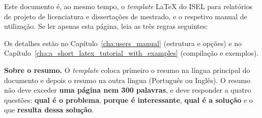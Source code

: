 Este documento é, ao mesmo tempo, o \emph{template} \LaTeX{} do ISEL para relatórios de projeto de licenciatura e dissertações de mestrado, e o respetivo manual de utilização. Se ler apenas esta página, leia as três regras seguintes:

\bigskip
\noindent%

\bigskip
Os detalhes estão no Capítulo~\ref{cha:users_manual} (estrutura e opções) e no Capítulo~\ref{cha:a_short_latex_tutorial_with_examples} (compilação e exemplos).

\textbf{Sobre o resumo.} O \emph{template} coloca primeiro o resumo na língua principal do documento e depois o resumo na outra língua (Português ou Inglês). O resumo não deve exceder \textbf{uma página nem 300 palavras}, e deve responder a quatro questões: \textbf{qual é o problema}, \textbf{porque é interessante}, \textbf{qual é a solução} e o que \textbf{resulta dessa solução}.

\printkeywords